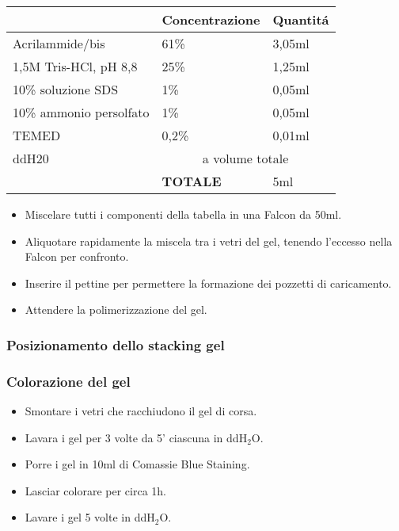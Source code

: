 \begin{tabular}{|l|l|l|} \hline
	& \textbf{Concentrazione} & \textbf{Quantit\'a} \\\hline
	Acrilammide/bis & 61\% & 3,05ml \\\hline
	1,5M Tris-HCl, pH 8,8 & 25\% & 1,25ml \\\hline
	10\% soluzione SDS & 1\% & 0,05ml \\\hline
	10\% ammonio persolfato & 1\% & 0,05ml \\\hline
	TEMED & 0,2\% & 0,01ml \\\hline
	ddH20 & \multicolumn{2}{c|}{a volume totale} \\\hline
	& \textbf{TOTALE} & 5ml \\\hline
\end{tabular}

\begin{itemize}
	\item Miscelare tutti i componenti della tabella in una Falcon
	da 50ml.
	\item Aliquotare rapidamente la miscela tra i vetri del gel, tenendo
	l'eccesso nella Falcon per confronto.
	\item Inserire il pettine per permettere la formazione dei pozzetti
	di caricamento.
	\item Attendere la polimerizzazione del gel.
\end{itemize}

\subsubsection{Posizionamento dello stacking gel}




\subsubsection{Colorazione del gel}
\begin{itemize}
\item Smontare i vetri che racchiudono il gel di corsa.
\item Lavara i gel per 3 volte da 5' ciascuna in ddH$_2$O.
\item Porre i gel in 10ml di Comassie Blue Staining.
\item Lasciar colorare per circa 1h.
\item Lavare i gel 5 volte in ddH$_2$O.
\end{itemize}


